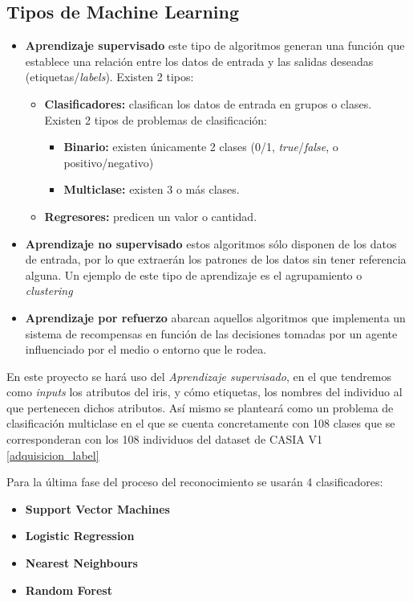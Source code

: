 \subsection{Tipos de Machine Learning}
\begin{itemize}
\tightlist
\item
  \textbf{Aprendizaje supervisado} este tipo de algoritmos generan una función que establece una relación entre los datos de entrada y las salidas deseadas (etiquetas/\emph{labels}).
  Existen 2 tipos:
  \begin{itemize}
      \item\textbf{Clasificadores: }clasifican los datos de entrada en grupos o clases. Existen 2 tipos de problemas de clasificación:
        \begin{itemize}
             \item\textbf{Binario: }existen únicamente 2 clases (0/1, \emph{true}/\emph{false}, o positivo/negativo)
              \item\textbf{Multiclase: }existen 3 o más clases.
        \end{itemize}
      \item\textbf{Regresores: }predicen un valor o cantidad.
  \end{itemize}
\item
  \textbf{Aprendizaje no supervisado} estos algoritmos sólo disponen de los datos de entrada, por lo que extraerán los patrones de los datos sin tener referencia alguna. Un ejemplo de este tipo de aprendizaje es el agrupamiento o \emph{clustering}
 \item
  \textbf{Aprendizaje por refuerzo} abarcan aquellos algoritmos que implementa un sistema de recompensas en función de las decisiones tomadas por un agente influenciado por el medio o entorno que le rodea.
\end{itemize}

En este proyecto se hará uso del \emph{Aprendizaje supervisado}, en el que tendremos como \emph{inputs} los atributos del iris, y cómo etiquetas, los nombres del individuo al que pertenecen dichos atributos.
Así mismo se planteará como un problema de clasificación multiclase en el que se cuenta concretamente con 108 clases que se corresponderan con los 108 individuos del dataset de CASIA V1 \ref{adquisicion_label}

Para la última fase del proceso del reconocimiento se usarán 4 clasificadores:
\begin{itemize}
\tightlist
    \item\textbf{Support Vector Machines }
    \item\textbf{Logistic Regression}
    \item\textbf{Nearest Neighbours} 
    \item\textbf{Random Forest}
\end{itemize}

